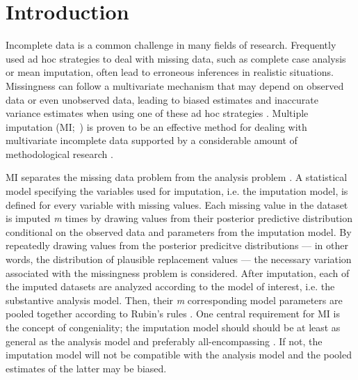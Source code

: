 \documentclass[10pt, a4paper, titlepage]{article}
\begin{document}
\newpage
\tableofcontents
\newpage
\section{Introduction}
Incomplete data is a common challenge in many fields of research. Frequently used ad hoc strategies to deal with missing data, such as complete case analysis or mean imputation, often lead to erroneous inferences in realistic situations. Missingness can follow a multivariate mechanism that may depend on observed data or even unobserved data, leading to biased estimates and inaccurate variance estimates when using one of these ad hoc strategies \citep{buurenFlexibleImputationMissing2018, kang2013, enders2017, austin2021, little2002}. Multiple imputation (MI;~) is proven to be an effective method for dealing with multivariate incomplete data supported by a considerable amount of methodological research \citep{mistlerComparisonJointModel2017, buurenFlexibleImputationMissing2018, enders2017, burgette2010, austin2021, audigier2018, vanbuuren2007, grund2021, hughes2014, little2002}.

MI separates the missing data problem from the analysis problem \citep{mistlerComparisonJointModel2017, buurenFlexibleImputationMissing2018, enders2017, burgette2010, austin2021, audigier2018, vanbuuren2007, grund2021, hughes2014, little2002, carpenter2013, bartlett2015}. A statistical model specifying the variables used for imputation, i.e. the imputation model, is defined for every variable with missing values. Each missing value in the dataset is imputed \textit{m} times by drawing values from their posterior predictive distribution conditional on the observed data and parameters from the imputation model. By repeatedly drawing values from the posterior predicitve distributions --- in other words, the distribution of plausible replacement values --- the necessary variation associated with the missingness problem is considered. After imputation, each of the imputed datasets are analyzed according to the model of interest, i.e. the substantive analysis model. Then, their \textit{m} corresponding model parameters are pooled together according to Rubin's rules \citep{rubin1987}. 
One central requirement for MI is the concept of congeniality; the imputation model should should be at least as general as the analysis model and preferably all-encompassing \citep{grund2018, enders2018, meng1994multiple, bartlett2015, grund2016, little2002}. If not, the imputation model will not be compatible with the analysis model and the pooled estimates of the latter may be biased. 
\end{document}
